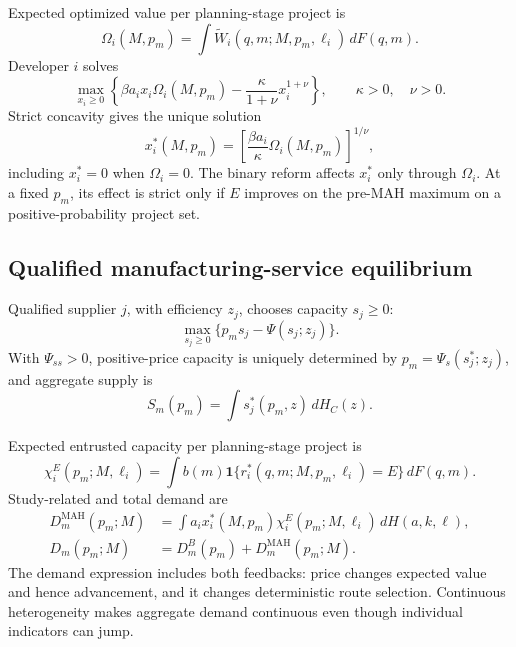 \documentclass[11pt]{article}
\begin{document}
Expected optimized value per planning-stage project is
\begin{equation}
  \Omega_i(M,p_m)
  =
  \int \widetilde W_i(q,m;M,p_m,\ell_i)\,dF(q,m).
  \label{eq:p16m-omega}
\end{equation}
Developer \(i\) solves
\begin{equation}
  \max_{x_i\geq0}
  \left\{
  \beta a_ix_i\Omega_i(M,p_m)
  -
  \frac{\kappa}{1+\nu}x_i^{1+\nu}
  \right\},
  \qquad \kappa>0,\quad \nu>0.
  \label{eq:p16m-advancement-problem}
\end{equation}
Strict concavity gives the unique solution
\begin{equation}
  x_i^*(M,p_m)
  =
  \left[
  \frac{\beta a_i}{\kappa}\Omega_i(M,p_m)
  \right]^{1/\nu},
  \label{eq:p16m-advancement}
\end{equation}
including \(x_i^*=0\) when \(\Omega_i=0\). The binary reform affects
\(x_i^*\) only through \(\Omega_i\). At a fixed \(p_m\), its effect is
strict only if \(E\) improves on the pre-MAH maximum on a
positive-probability project set.

\subsection{Qualified manufacturing-service equilibrium}
\label{subsec:p16m-cmo}

Qualified supplier \(j\), with efficiency \(z_j\), chooses capacity
\(s_j\geq0\):
\begin{equation}
  \max_{s_j\geq0}\{p_ms_j-\Psi(s_j;z_j)\}.
  \label{eq:p16m-supplier}
\end{equation}
With \(\Psi_{ss}>0\), positive-price capacity is uniquely determined by
\(p_m=\Psi_s(s_j^*;z_j)\), and aggregate supply is
\[
  S_m(p_m)=\int s_j^*(p_m,z)\,dH_C(z).
\]

Expected entrusted capacity per planning-stage project is
\begin{equation}
  \chi_i^E(p_m;M,\ell_i)
  =
  \int b(m)\mathbf 1\{r_i^*(q,m;M,p_m,\ell_i)=E\}\,dF(q,m).
  \label{eq:p16m-project-demand}
\end{equation}
Study-related and total demand are
\begin{equation}
  \begin{aligned}
  D_m^{\mathrm{MAH}}(p_m;M)
  &=
  \int a_ix_i^*(M,p_m)\chi_i^E(p_m;M,\ell_i)\,dH(a,k,\ell),\\
  D_m(p_m;M)
  &=D_m^B(p_m)+D_m^{\mathrm{MAH}}(p_m;M).
  \end{aligned}
  \label{eq:p16m-demand}
\end{equation}
The demand expression includes both feedbacks: price changes expected value
and hence advancement, and it changes deterministic route selection.
Continuous heterogeneity makes aggregate demand continuous even though
individual indicators can jump.
\end{document}
